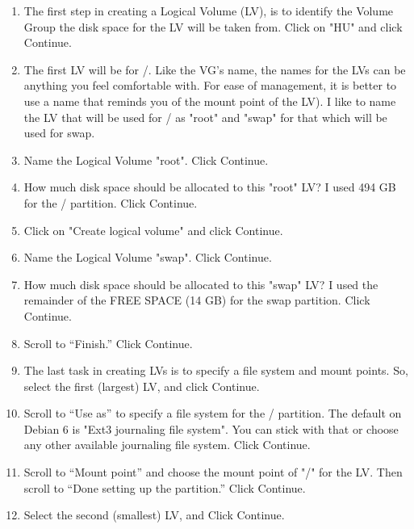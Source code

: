 \documentclass[12pt,notitlepage,onecolumn,oneside,openany,draft]{memoir}
\begin{document}
\begin{enumerate}
\item \textsf{The first step in creating a Logical Volume (LV), is to identify the Volume Group the disk space for the LV will be taken from. Click on "HU" and click Continue.} 

\item \textsf{The first LV will be for /. Like the VG’s name, the names for the LVs can be anything you feel comfortable with. For ease of management, it is better to use a name that reminds you of the mount point of the LV). I like to name the LV that will be used for / as "root" and "swap" for that which will be used for swap.} 

\item \textsf{Name the Logical Volume "root". Click Continue.} 

\item \textsf{How much disk space should be allocated to this "root" LV? I used 494 GB for the / partition. Click Continue.} 

\item \textsf{Click on "Create logical volume" and click Continue.}
 
\item \textsf{Name the Logical Volume "swap". Click Continue.} 

\item \textsf{How much disk space should be allocated to this "swap" LV? I used the remainder of the FREE SPACE (14 GB) for the swap partition. Click Continue.} 

\item \textsf{Scroll to “Finish.” Click Continue.} 

\item \textsf{The last task in creating LVs is to specify a file system and mount points. So, select the first (largest) LV, and click Continue.} 

\item \textsf{Scroll to “Use as” to specify a file system for the / partition. The default on Debian 6 is "Ext3 journaling file system". You can stick with that or choose any other available journaling file system. Click Continue.}
 
\item \textsf{Scroll to “Mount point” and choose the mount point of "/" for the LV. Then scroll to “Done setting up the partition.” Click Continue.} 

\item \textsf{Select the second (smallest) LV, and Click Continue.} 


\end{enumerate}
\end{document}
